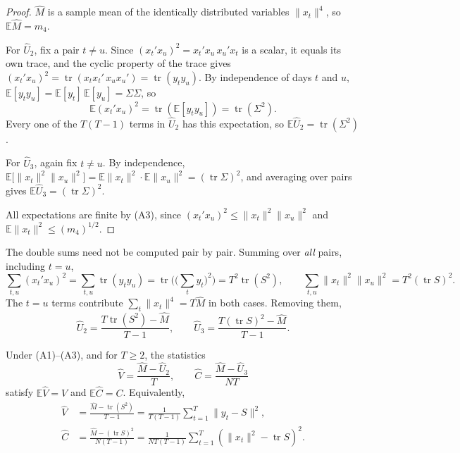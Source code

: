 \begin{proof}
$\hat M$ is a sample mean of the identically distributed variables $\|x_t\|^4$, so $\mathbb{E}\hat M = m_4$.

For $\hat U_2$, fix a pair $t \ne u$. Since $(x_t'x_u)^2 = x_t'x_u\,x_u'x_t$ is a scalar, it equals its own trace, and the cyclic property of the trace gives $(x_t'x_u)^2 = \operatorname{tr}(x_tx_t'\,x_ux_u') = \operatorname{tr}(y_t y_u)$. By independence of days $t$ and $u$, $\mathbb{E}[y_t y_u] = \mathbb{E}[y_t]\,\mathbb{E}[y_u] = \Sigma\Sigma$, so
\[
  \mathbb{E}(x_t'x_u)^2 = \operatorname{tr}\left(\mathbb{E}[y_t y_u]\right) = \operatorname{tr}(\Sigma^2).
\]
Every one of the $T(T-1)$ terms in $\hat U_2$ has this expectation, so $\mathbb{E}\hat U_2 = \operatorname{tr}(\Sigma^2)$.

For $\hat U_3$, again fix $t \ne u$. By independence, $\mathbb{E}\big[\|x_t\|^2\|x_u\|^2\big] = \mathbb{E}\|x_t\|^2\cdot\mathbb{E}\|x_u\|^2 = (\operatorname{tr}\Sigma)^2$, and averaging over pairs gives $\mathbb{E}\hat U_3 = (\operatorname{tr}\Sigma)^2$.

All expectations are finite by (A3), since $(x_t'x_u)^2 \le \|x_t\|^2\|x_u\|^2$ and $\mathbb{E}\|x_t\|^2 \le (m_4)^{1/2}$.
\end{proof}

The double sums need not be computed pair by pair. Summing over \emph{all} pairs, including $t = u$,
\[
  \sum_{t,u}(x_t'x_u)^2 = \sum_{t,u}\operatorname{tr}(y_t y_u) = \operatorname{tr}\Big(\big(\textstyle\sum_t y_t\big)^2\Big) = T^2\operatorname{tr}(S^2),
  \qquad
  \sum_{t,u}\|x_t\|^2\|x_u\|^2 = T^2(\operatorname{tr}S)^2 .
\]
The $t = u$ terms contribute $\sum_t\|x_t\|^4 = T\hat M$ in both cases. Removing them,
\[
  \hat U_2 = \frac{T\operatorname{tr}(S^2) - \hat M}{T - 1}, \qquad
  \hat U_3 = \frac{T(\operatorname{tr}S)^2 - \hat M}{T - 1}.
\]

\begin{corollary}\label{cor:df-VC}
Under (A1)--(A3), and for $T \ge 2$, the statistics
\[
  \hat V = \frac{\hat M - \hat U_2}{T}, \qquad \hat C = \frac{\hat M - \hat U_3}{NT}
\]
satisfy $\mathbb{E}\hat V = V$ and $\mathbb{E}\hat C = C$. Equivalently,
\begin{align*}
  \hat V &= \frac{\hat M - \operatorname{tr}(S^2)}{T - 1} = \frac{1}{T(T-1)}\sum_{t=1}^T \|y_t - S\|^2, \\
  \hat C &= \frac{\hat M - (\operatorname{tr}S)^2}{N(T-1)} = \frac{1}{NT(T-1)}\sum_{t=1}^T \left(\|x_t\|^2 - \operatorname{tr}S\right)^2 .
\end{align*}
\end{corollary}


